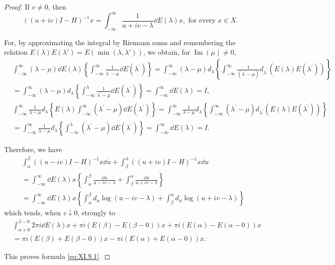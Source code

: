 \begin{proof}
 If $v \neq 0$, then 
\[
((u + i v) I - H) ^{-1} x = \int_{- \infty} ^{\infty} \frac {1}{u + i v - \lambda} \dd E (\lambda) x, \text{ for every } x \in X. \]

For, by approximating the integral by Riemann sums and remembering the relation $E(\lambda)E(\lambda') = E(\min (\lambda ,\lambda'))$, we obtain, for $\operatorname{Im}(\mu)\neq 0$, 
\[
\begin{aligned}
&\int_{- \infty} ^{\infty} (\lambda - \mu) \dd E (\lambda) \left\{\int_{- \infty} ^{\infty} \frac {1}{\lambda^{\prime} - \mu} \dd E (\lambda^{\prime}) \right\} = \int_{- \infty} ^{\infty} (\lambda - \mu) d _{\lambda} \left\{\int_{- \infty} ^{\infty} \frac {1}{(\lambda^{\prime} - \mu)} d _ {\lambda^{\prime}} (E (\lambda) E (\lambda^{\prime})) \right\}
\\
&= \int_{- \infty} ^{\infty} (\lambda - \mu) d _{\lambda} \left\{\int_{- \infty} ^{\lambda} \frac {1}{\lambda^{\prime} - \mu} \dd E (\lambda^{\prime}) \right\} = \int_{- \infty} ^{\infty} \dd E (\lambda) = I,
\\
&\int_{- \infty} ^{\infty} \frac {1}{\lambda - \mu} d _{\lambda} \left\{E (\lambda) \int_{- \infty} ^{\infty} (\lambda^{\prime} - \mu) \dd E (\lambda^{\prime}) \right\} = \int_{- \infty} ^{\infty} \frac {1}{\lambda - \mu} d _{\lambda} \left\{\int_{- \infty} ^{\infty} (\lambda^{\prime} - \mu) d _ {\lambda^{\prime}} (E (\lambda) E (\lambda^{\prime})) \right\}
\\
&= \int_{- \infty} ^{\infty} \frac {1}{\lambda - \mu} d _{\lambda} \left\{\int_{- \infty} ^{\lambda} (\lambda^{\prime} - \mu) \dd E (\lambda^{\prime}) \right\} = \int_{- \infty} ^{\infty} \dd E (\lambda) = I.
\end{aligned}
\]

Therefore, we have 
\[
\begin{aligned}
& \int_{\alpha} ^{\beta} ((u - i v) I - H) ^{-1} x \dd u + \int_{\beta} ^{\alpha} ((u + i v) I - H) ^{-1} x \dd u
\\
&= \int_{- \infty} ^{\infty} \dd E (\lambda) x \left\{\int_{\alpha} ^{\beta} \frac {\dd u}{u - i v - \lambda} + \int_{\beta} ^{\alpha} \frac {\dd u}{u + i v - \lambda} \right\}
\\
&= \int_{- \infty} ^{\infty} \dd E (\lambda) x \left\{\int_{\alpha} ^{\beta} d _{u} \log (u - i v - \lambda) + \int_{\beta} ^{\alpha} d _{u} \log (u + i v - \lambda) \right\}
\end{aligned}
\]
which tends, when $v \downarrow 0$, strongly to 
\[
\begin{aligned}
&\int_{\alpha +0} ^{\beta -0} 2 \pi i \dd E (\lambda) x + \pi i (E (\beta) - E (\beta - 0)) x + \pi i (E (\alpha) - E (\alpha - 0)) x
\\
&= \pi i (E (\beta) + E (\beta - 0)) x - \pi i (E (\alpha) + E (\alpha - 0)) x.
\end{aligned}
\]

This proves formula \eqref{eq:XI.9.1}. 
\end{proof}

